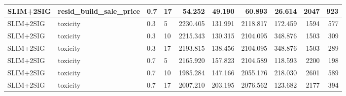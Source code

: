 \begin{longtable}{llllrrrrrr}
SLIM+2SIG & resid_build_sale_price & 0.7 & 17 & 54.252 & 49.190 & 60.893 & 26.614 & 2047 & 923 \\
\midrule
SLIM+2SIG & toxicity & 0.3 & 5 & 2230.405 & 131.991 & 2118.817 & 172.459 & 1594 & 577 \\
SLIM+2SIG & toxicity & 0.3 & 10 & 2215.343 & 130.315 & 2104.095 & 348.876 & 1503 & 309 \\
SLIM+2SIG & toxicity & 0.3 & 17 & 2193.815 & 138.456 & 2104.095 & 348.876 & 1503 & 289 \\
SLIM+2SIG & toxicity & 0.7 & 5 & 2165.920 & 157.823 & 2104.589 & 118.593 & 2200 & 198 \\
SLIM+2SIG & toxicity & 0.7 & 10 & 1985.284 & 147.166 & 2055.176 & 218.030 & 2601 & 589 \\
SLIM+2SIG & toxicity & 0.7 & 17 & 2007.210 & 203.195 & 2076.562 & 123.682 & 2177 & 394 \\
\end{longtable}